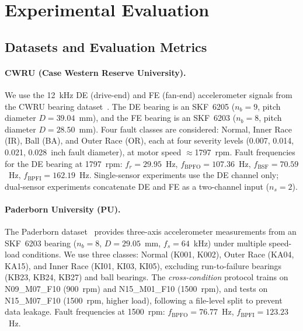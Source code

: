 
\section{Experimental Evaluation}
\label{sec:experiments}

\subsection{Datasets and Evaluation Metrics}
\label{subsec:datasets}

\paragraph{CWRU (Case Western Reserve University).}
We use the 12~kHz DE (drive-end) and FE (fan-end) accelerometer signals from
the CWRU bearing dataset~\cite{cwru}.
The DE bearing is an SKF~6205 ($n_b=9$, pitch diameter $D=39.04$~mm),
and the FE bearing is an SKF~6203 ($n_b=8$, pitch diameter $D=28.50$~mm).
Four fault classes are considered: Normal, Inner Race (IR), Ball (BA),
and Outer Race (OR), each at four severity levels (0.007, 0.014, 0.021,
0.028~inch fault diameter), at motor speed $\approx$1797~rpm.
Fault frequencies for the DE bearing at 1797~rpm:
$f_r = 29.95$~Hz, $f_{\text{BPFO}} = 107.36$~Hz, $f_{\text{BSF}} = 70.59$~Hz,
$f_{\text{BPFI}} = 162.19$~Hz.
Single-sensor experiments use the DE channel only; dual-sensor experiments
concatenate DE and FE as a two-channel input ($n_s = 2$).

\paragraph{Paderborn University (PU).}
The Paderborn dataset~\cite{paderborn} provides three-axis accelerometer
measurements from an SKF~6203 bearing ($n_b=8$, $D=29.05$~mm, $f_s=64$~kHz)
under multiple speed-load conditions.
We use three classes: Normal (K001, K002), Outer Race (KA04, KA15),
and Inner Race (KI01, KI03, KI05), excluding run-to-failure bearings
(KB23, KB24, KB27) and ball bearings.
The \emph{cross-condition} protocol trains on N09\_M07\_F10 (900~rpm)
and N15\_M01\_F10 (1500~rpm), and tests on N15\_M07\_F10 (1500~rpm, higher
load), following a file-level split to prevent data leakage.
Fault frequencies at 1500~rpm:
$f_{\text{BPFO}} = 76.77$~Hz, $f_{\text{BPFI}} = 123.23$~Hz.

